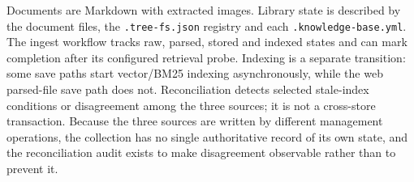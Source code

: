 Documents are Markdown with extracted images. Library state is described by
the document files, the \texttt{.tree-fs.json} registry and each
\texttt{.knowledge-base.yml}. The ingest workflow tracks raw, parsed, stored
and indexed states and can mark completion after its configured retrieval
probe. Indexing is a separate transition: some save paths start vector/BM25
indexing asynchronously, while the web parsed-file save path does not.
Reconciliation detects selected stale-index conditions or disagreement among
the three sources; it is not a cross-store transaction. Because the three
sources are written by different management operations, the collection has no
single authoritative record of its own state, and the reconciliation audit
exists to make disagreement observable rather than to prevent it.
